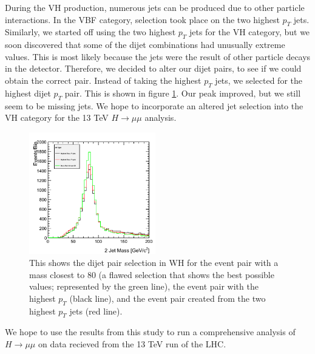 \documentclass[12pt]{article}
\begin{document}
During the VH production, numerous jets can be produced due to other particle interactions.
In the VBF category, selection took place on the two highest $p_{T}$ jets. 
Similarly, we started off using the two highest $p_{T}$ jets for the VH category, 
but we soon discovered that some of the dijet combinations had unusually extreme values. 
This is most likely because the jets were the result of other particle decays in the detector.
Therefore, we decided to alter our dijet pairs, to see if we could obtain the correct pair. 
Instead of taking the highest $p_{T}$ jets, we selected for the highest dijet $p_{T}$ pair. This is shown 
in figure \ref{fig:dijetSel}. Our peak improved, but we still seem to be missing jets.
We hope to incorporate an altered jet selection into the VH category for the 13 TeV $H\rightarrow\mu\mu$ analysis.
\begin{figure}[!hbtp]
\begin{center}
    \includegraphics[width=0.49\textwidth]{images/Hist_Reco2PlotsPt30Eta2.png}
    \caption{ \label{fig:dijetSel}
         This shows the dijet pair selection in WH for the event pair with a mass closest to 80 (a flawed selection that 
	 shows the best possible values; represented by the green line), the event pair with the highest $p_{T}$ (black line), 
	 and the event pair created from the two highest $p_{T}$ jets (red line).
      }
\end{center}
\end{figure}

We hope to use the results from this study to run a comprehensive analysis of $H\rightarrow\mu\mu$ on data recieved
from the 13 TeV run of the LHC.
\end{document}
